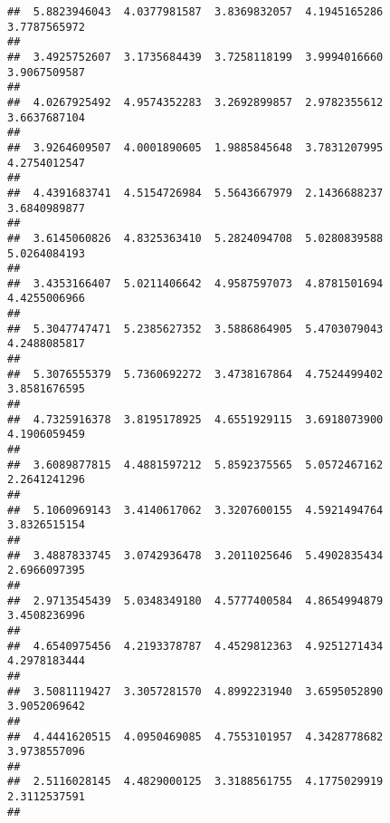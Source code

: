 \documentclass[]{article}
\begin{document}
\begin{verbatim}
##  5.8823946043  4.0377981587  3.8369832057  4.1945165286  3.7787565972 
##                                                                       
##  3.4925752607  3.1735684439  3.7258118199  3.9994016660  3.9067509587 
##                                                                       
##  4.0267925492  4.9574352283  3.2692899857  2.9782355612  3.6637687104 
##                                                                       
##  3.9264609507  4.0001890605  1.9885845648  3.7831207995  4.2754012547 
##                                                                       
##  4.4391683741  4.5154726984  5.5643667979  2.1436688237  3.6840989877 
##                                                                       
##  3.6145060826  4.8325363410  5.2824094708  5.0280839588  5.0264084193 
##                                                                       
##  3.4353166407  5.0211406642  4.9587597073  4.8781501694  4.4255006966 
##                                                                       
##  5.3047747471  5.2385627352  3.5886864905  5.4703079043  4.2488085817 
##                                                                       
##  5.3076555379  5.7360692272  3.4738167864  4.7524499402  3.8581676595 
##                                                                       
##  4.7325916378  3.8195178925  4.6551929115  3.6918073900  4.1906059459 
##                                                                       
##  3.6089877815  4.4881597212  5.8592375565  5.0572467162  2.2641241296 
##                                                                       
##  5.1060969143  3.4140617062  3.3207600155  4.5921494764  3.8326515154 
##                                                                       
##  3.4887833745  3.0742936478  3.2011025646  5.4902835434  2.6966097395 
##                                                                       
##  2.9713545439  5.0348349180  4.5777400584  4.8654994879  3.4508236996 
##                                                                       
##  4.6540975456  4.2193378787  4.4529812363  4.9251271434  4.2978183444 
##                                                                       
##  3.5081119427  3.3057281570  4.8992231940  3.6595052890  3.9052069642 
##                                                                       
##  4.4441620515  4.0950469085  4.7553101957  4.3428778682  3.9738557096 
##                                                                       
##  2.5116028145  4.4829000125  3.3188561755  4.1775029919  2.3112537591 
##                                                                       

\end{verbatim}
\end{document}
